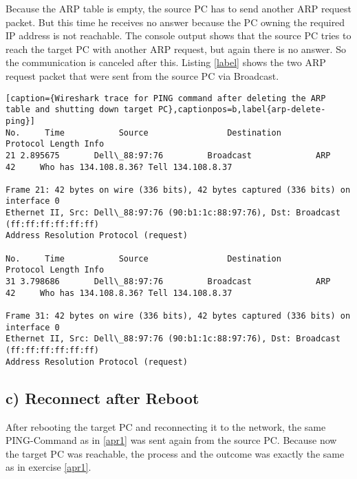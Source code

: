 Because the ARP table is empty, the source PC has to send another ARP request packet. But this time he receives no answer because the PC owning the required IP address is not reachable. The console output shows that the source PC tries to reach the target PC with another ARP request, but again there is no answer. So the communication is canceled after this. Listing \ref{label} shows the two ARP request packet that were sent from the source PC via Broadcast.\\
 \begin{lstlisting}[caption={Wireshark trace for PING command after deleting the ARP table and shutting down target PC},captionpos=b,label{arp-delete-ping}]
No.     Time           Source                Destination           Protocol Length Info
21 2.895675       Dell\_88:97:76         Broadcast             ARP      42     Who has 134.108.8.36? Tell 134.108.8.37

Frame 21: 42 bytes on wire (336 bits), 42 bytes captured (336 bits) on interface 0
Ethernet II, Src: Dell\_88:97:76 (90:b1:1c:88:97:76), Dst: Broadcast (ff:ff:ff:ff:ff:ff)
Address Resolution Protocol (request)

No.     Time           Source                Destination           Protocol Length Info
31 3.798686       Dell\_88:97:76         Broadcast             ARP      42     Who has 134.108.8.36? Tell 134.108.8.37

Frame 31: 42 bytes on wire (336 bits), 42 bytes captured (336 bits) on interface 0
Ethernet II, Src: Dell\_88:97:76 (90:b1:1c:88:97:76), Dst: Broadcast (ff:ff:ff:ff:ff:ff)
Address Resolution Protocol (request)
 \end{lstlisting}
 
\subsection{c) Reconnect after Reboot}
After rebooting the target PC and reconnecting it to the network, the same PING-Command as in \ref{apr1} was sent again from the source PC. Because now the target PC was reachable, the process and the outcome was exactly the same as in exercise \ref{apr1}.
